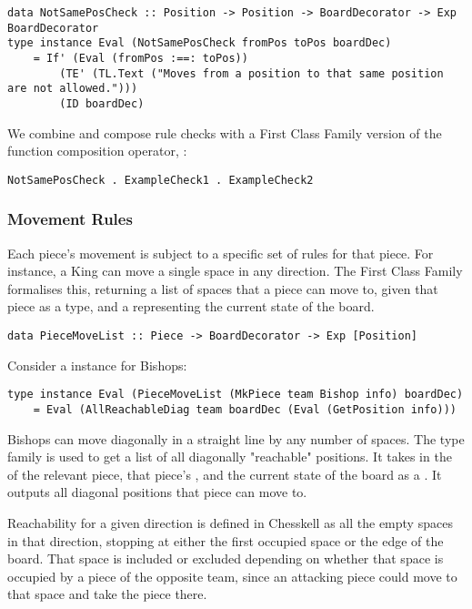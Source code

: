 \begin{lstlisting}
data NotSamePosCheck :: Position -> Position -> BoardDecorator -> Exp BoardDecorator
type instance Eval (NotSamePosCheck fromPos toPos boardDec)
    = If' (Eval (fromPos :==: toPos))
        (TE' (TL.Text ("Moves from a position to that same position are not allowed.")))
        (ID boardDec)
\end{lstlisting}

We combine and compose rule checks with a First Class Family version of the function composition operator, :

\begin{lstlisting}
NotSamePosCheck . ExampleCheck1 . ExampleCheck2
\end{lstlisting}

\subsubsection{Movement Rules}

Each piece's movement is subject to a specific set of rules for that piece. For instance, a King can move a single space in any direction. The  First Class Family formalises this, returning a list of spaces that a piece can move to, given that piece as a  type, and a  representing the current state of the board.

\begin{lstlisting}
data PieceMoveList :: Piece -> BoardDecorator -> Exp [Position]
\end{lstlisting}

Consider a  instance for Bishops:

\begin{lstlisting}
type instance Eval (PieceMoveList (MkPiece team Bishop info) boardDec)
    = Eval (AllReachableDiag team boardDec (Eval (GetPosition info)))
\end{lstlisting}

Bishops can move diagonally in a straight line by any number of spaces. The type family  is used to get a list of all diagonally "reachable" positions. It takes in the  of the relevant piece, that piece's , and the current state of the board as a . It outputs all diagonal positions that piece can move to.

Reachability for a given direction is defined in Chesskell as all the empty spaces in that direction, stopping at either the first occupied space or the edge of the board. That space is included or excluded depending on whether that space is occupied by a piece of the opposite team, since an attacking piece could move to that space and take the piece there.

